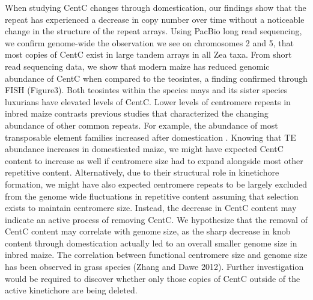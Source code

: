 When studying CentC changes through domestication, our findings show that the repeat has experienced a decrease in copy number over time without a noticeable change in the structure of the repeat arrays. Using PacBio long read sequencing, we confirm genome-wide the observation we see on chromosomes 2 and 5, that most copies of CentC exist in large tandem arrays in all Zea taxa.    From short read sequencing data, we show that modern maize has reduced genomic abundance of CentC when compared to the teosintes, a finding confirmed through FISH (Figure3).  Both teosintes within the species mays and its sister species luxurians have elevated levels of CentC.  Lower levels of centromere repeats in inbred maize contrasts previous studies that characterized the changing abundance of other common repeats.  For example, the abundance of most transposable element families increased after domestication \citep{Chia2012}.  Knowing that TE abundance increases in domesticated maize, we might have expected CentC content to increase as well if centromere size had to expand alongside most other repetitive content.  Alternatively, due to their structural role in kinetichore formation, we might have also expected centromere repeats to be largely excluded from the genome wide fluctuations in repetitive content assuming that selection exists to maintain centromere size.  Instead, the decrease in CentC content may indicate an active process of removing CentC.  We hypothesize that the removal of CentC content may correlate with genome size, as the sharp decrease in knob content through domestication actually led to an overall smaller genome size in inbred maize. The correlation between  functional  centromere size and genome size has been observed in grass species (Zhang and Dawe 2012).   Further investigation would be required to discover whether only those copies of CentC outside of the active kinetichore  are being deleted.

